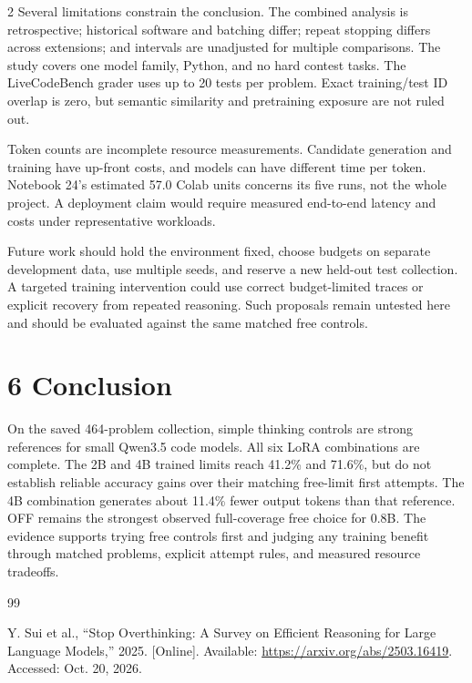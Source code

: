 \documentclass[11pt,letterpaper]{article}
\begin{document}
\begin{multicols}{2}
Several limitations constrain the conclusion. The combined analysis is retrospective; historical software and batching differ; repeat stopping differs across extensions; and intervals are unadjusted for multiple comparisons. The study covers one model family, Python, and no hard contest tasks. The LiveCodeBench grader uses up to 20 tests per problem. Exact training/test ID overlap is zero, but semantic similarity and pretraining exposure are not ruled out.\par

Token counts are incomplete resource measurements. Candidate generation and training have up-front costs, and models can have different time per token. Notebook 24's estimated 57.0 Colab units concerns its five runs, not the whole project. A deployment claim would require measured end-to-end latency and costs under representative workloads.\par

Future work should hold the environment fixed, choose budgets on separate development data, use multiple seeds, and reserve a new held-out test collection. A targeted training intervention could use correct budget-limited traces or explicit recovery from repeated reasoning. Such proposals remain untested here and should be evaluated against the same matched free controls.\par

\section*{6 Conclusion}

On the saved 464-problem collection, simple thinking controls are strong references for small Qwen3.5 code models. All six LoRA combinations are complete. The 2B and 4B trained limits reach 41.2\% and 71.6\%, but do not establish reliable accuracy gains over their matching free-limit first attempts. The 4B combination generates about 11.4\% fewer output tokens than that reference. OFF remains the strongest observed full-coverage free choice for 0.8B. The evidence supports trying free controls first and judging any training benefit through matched problems, explicit attempt rules, and measured resource tradeoffs.\par

\begin{thebibliography}{99}

 Y. Sui et al., ``Stop Overthinking: A Survey on Efficient Reasoning for Large Language Models,'' 2025. [Online]. Available: \url{https://arxiv.org/abs/2503.16419}. Accessed: Oct. 20, 2026.


\end{thebibliography}
\end{multicols}
\end{document}
